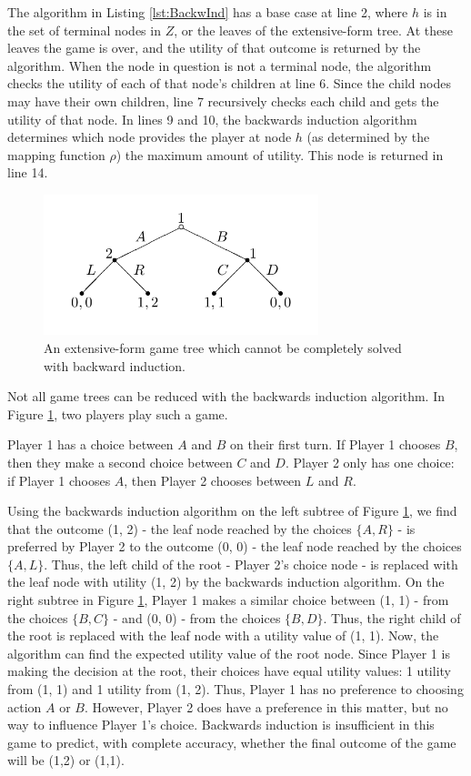 The algorithm in Listing \ref{lst:BackwInd} has a base case at line 2, where $h$ is in the set of terminal nodes in $Z$, or the leaves of the extensive-form tree. At these leaves the game is over, and the utility of that outcome is returned by the algorithm. When the node in question is not a terminal node, the algorithm checks the utility of each of that node's children at line 6. Since the child nodes may have their own children, line 7 recursively checks each child and gets the utility of that node. In lines 9 and 10, the backwards induction algorithm determines which node provides the player at node $h$ (as determined by the mapping function $\rho$) the maximum amount of utility. This node is returned in line 14.\\

\begin{figure}[H]
  \centering
  \includegraphics[width=8cm]{figures/NoBackward.png}
  \caption{An extensive-form game tree which cannot be completely solved with backward induction.}
  \label{fig:noBackward}
\end{figure}

Not all game trees can be reduced with the backwards induction algorithm. In Figure \ref{fig:noBackward}, two players play such a game.

\begin{exmp}
  Player 1 has a choice between $A$ and $B$ on their first turn. If Player 1 chooses $B$, then they make a second choice between $C$ and $D$. Player 2 only has one choice: if Player 1 chooses $A$, then Player 2 chooses between $L$ and $R$.
\end{exmp}
Using the backwards induction algorithm on the left subtree of Figure \ref{fig:noBackward}, we find that the outcome (1, 2) - the leaf node reached by the choices $\{A, R\}$ - is preferred by Player 2 to the outcome (0, 0) - the leaf node reached by the choices $\{A, L\}$. Thus, the left child of the root - Player 2's choice node - is replaced with the leaf node with utility (1, 2) by the backwards induction algorithm. On the right subtree in Figure \ref{fig:noBackward}, Player 1 makes a similar choice between (1, 1) - from the choices $\{B, C\}$ - and (0, 0) - from the choices $\{B, D\}$. Thus, the right child of the root is replaced with the leaf node with a utility value of (1, 1). Now, the algorithm can find the expected utility value of the root node. Since Player 1 is making the decision at the root, their choices have equal utility values: 1 utility from (1, 1) and 1 utility from (1, 2). Thus, Player 1 has no preference to choosing action $A$ or $B$. However, Player 2 does have a preference in this matter, but no way to influence Player 1's choice. Backwards induction is insufficient in this game to predict, with complete accuracy, whether the final outcome of the game will be (1,2) or (1,1).

